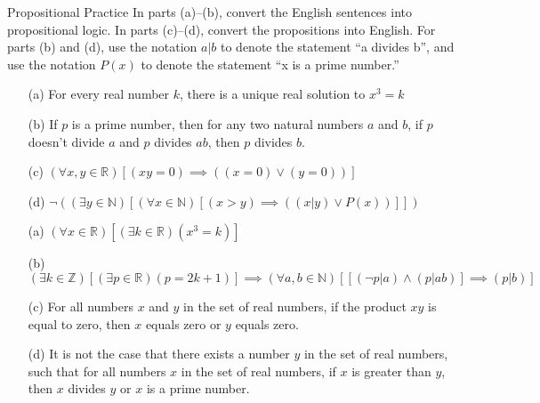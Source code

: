 \begin{homeworkProblem}{Propositional Practice}
    In parts (a)–(b), convert the English sentences into propositional 
    logic. In parts (c)–(d), convert the propositions into English. For 
    parts (b) and (d), use the notation $a | b$ to denote the statement ``a 
    divides b”, and use the notation $P(x)$ to denote the statement ``x is a 
    prime number.”

    \begin{itemize}
        \item[(a)] For every real number $k$, there is a unique real 
        solution to $x^3 = k$
        \item[(b)] If $p$ is a prime number, then for any two natural numbers $a$ and $b$, if $p$ doesn’t divide $a$ and $p$ divides $ab$, then $p$ divides $b$.
        \item[(c)] $(\forall x, y \in \mathbb{R})[(xy = 0) \implies ((x = 0) \vee (y = 0))] $
        \item[(d)] $\neg ((\exists y \in \mathbb{N})[(\forall x \in \mathbb{N})[(x > y) \implies (( x | y) \vee P(x))]])$
    \end{itemize}

    \solution
    
    \begin{itemize}
        \item[(a)] $(\forall x \in \mathbb{R})[(\exists k \in \mathbb{R})
        (x^3 = k)]$
        \item[(b)] $(\exists k \in \mathbb{Z})[(\exists p \in \mathbb{R})(p 
        = 2k+1)] \implies (\forall a, b \in \mathbb{N})[[(\neg p | a) 
        \wedge (p | ab)] \implies (p|b)]$
        \item[(c)] For all numbers $x$ and $y$ in the set of real numbers, if the product $xy$ is equal to zero, then $x$ equals zero or $y$ equals zero.
        \item[(d)] It is not the case that there exists a number $y$ in the set of real numbers, such that for all numbers $x$ in the set of real numbers, if $x$ is greater than $y$, then $x$ divides $y$ or $x$ is a prime number. 
    \end{itemize}
    
\end{homeworkProblem}
